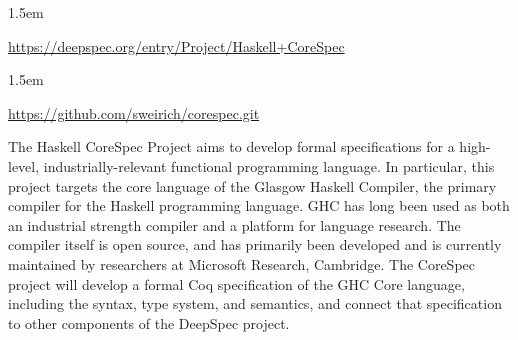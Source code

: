 \documentclass[12pt,twoside]{article}
\begin{document}
\begin{mddefinitions}%


\begin{mdbmarginx}{}{}{}{1.5em}%
\begin{mddefdata}%
\href{https://deepspec.org/entry/Project/Haskell+CoreSpec}{{\ttfamily https://\hspace{0pt}deepspec.\hspace{0pt}org/\hspace{0pt}entry/\hspace{0pt}Project/\hspace{0pt}Haskell+\hspace{0pt}CoreSpec}}
\end{mddefdata}%
\end{mdbmarginx}%


\begin{mdbmarginx}{}{}{}{1.5em}%
\begin{mddefdata}%
\href{https://github.com/sweirich/corespec.git}{{\ttfamily https://\hspace{0pt}github.\hspace{0pt}com/\hspace{0pt}sweirich/\hspace{0pt}corespec.\hspace{0pt}git}}%
\end{mddefdata}%
\end{mdbmarginx}%
\end{mddefinitions}%

\noindent{}The Haskell CoreSpec Project aims to develop formal specifications for
a high-level, industrially-relevant functional programming
language. In particular, this project targets the core language of the
Glasgow Haskell Compiler, the primary compiler for the Haskell
programming language. GHC has long been used as both an industrial
strength compiler and a platform for language research. The compiler
itself is open source, and has primarily been developed and is
currently maintained by researchers at Microsoft Research,
Cambridge. The CoreSpec project will develop a formal Coq
specification of the GHC Core language, including the syntax, type
system, and semantics, and connect that specification to other
components of the DeepSpec project.%
\end{document}
